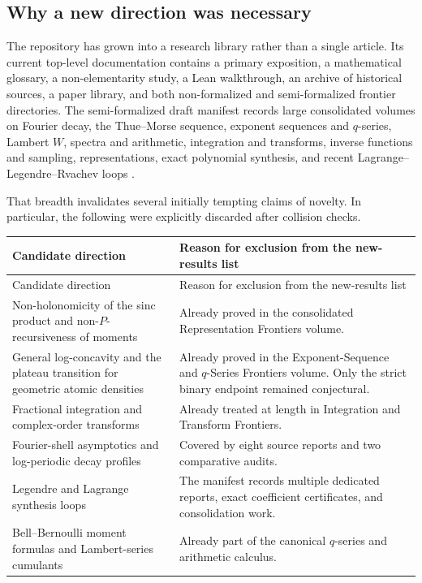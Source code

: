 \documentclass[11pt,oneside]{article}
\theoremstyle{definition}
\theoremstyle{remark}
\begin{document}
\subsection{Why a new direction was necessary}
The repository has grown into a research library rather than a single article.
Its current top-level documentation contains a primary exposition, a mathematical
glossary, a non-elementarity study, a Lean walkthrough, an archive of historical
sources, a paper library, and both non-formalized and semi-formalized frontier
directories.  The semi-formalized draft manifest records large consolidated
volumes on Fourier decay, the Thue--Morse sequence, exponent sequences and
$q$-series, Lambert $W$, spectra and arithmetic, integration and transforms,
inverse functions and sampling, representations, exact polynomial synthesis,
and recent Lagrange--Legendre--Rvachev loops \cite{repo,manifest}.

That breadth invalidates several initially tempting claims of novelty.  In
particular, the following were explicitly discarded after collision checks.

\begin{longtable}{p{}p{}}
\toprule
Candidate direction & Reason for exclusion from the new-results list\\
\midrule
\endfirsthead
\toprule
Candidate direction & Reason for exclusion from the new-results list\\
\midrule
\endhead
Non-holonomicity of the sinc product and non-$P$-recursiveness of moments & Already proved in the consolidated Representation Frontiers volume.\\
General log-concavity and the plateau transition for geometric atomic densities & Already proved in the Exponent-Sequence and $q$-Series Frontiers volume.  Only the strict binary endpoint remained conjectural.\\
Fractional integration and complex-order transforms & Already treated at length in Integration and Transform Frontiers.\\
Fourier-shell asymptotics and log-periodic decay profiles & Covered by eight source reports and two comparative audits.\\
Legendre and Lagrange synthesis loops & The manifest records multiple dedicated reports, exact coefficient certificates, and consolidation work.\\
Bell--Bernoulli moment formulas and Lambert-series cumulants & Already part of the canonical $q$-series and arithmetic calculus.\\
\bottomrule
\end{longtable}
\end{document}
